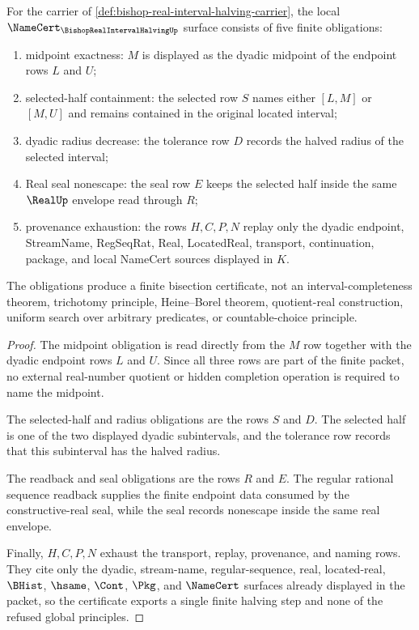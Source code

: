 \begin{theorem}
\label{thm:bishop-real-interval-halving-namecert-obligations}
For the carrier of \autoref{def:bishop-real-interval-halving-carrier}, the local $\NameCert_{\BishopRealIntervalHalvingUp}$ surface consists of five finite obligations:
\begin{enumerate}
\item midpoint exactness: $M$ is displayed as the dyadic midpoint of the endpoint rows $L$ and $U$;
\item selected-half containment: the selected row $S$ names either $[L,M]$ or $[M,U]$ and remains contained in the original located interval;
\item dyadic radius decrease: the tolerance row $D$ records the halved radius of the selected interval;
\item Real seal nonescape: the seal row $E$ keeps the selected half inside the same $\RealUp$ envelope read through $R$;
\item provenance exhaustion: the rows $H,C,P,N$ replay only the dyadic endpoint, StreamName, RegSeqRat, Real, LocatedReal, transport, continuation, package, and local NameCert sources displayed in $K$.
\end{enumerate}
The obligations produce a finite bisection certificate, not an interval-completeness theorem, trichotomy principle, Heine--Borel theorem, quotient-real construction, uniform search over arbitrary predicates, or countable-choice principle.
\end{theorem}
\begin{proof}
The midpoint obligation is read directly from the $M$ row together with the dyadic endpoint rows $L$ and $U$. Since all three rows are part of the finite packet, no external real-number quotient or hidden completion operation is required to name the midpoint.

The selected-half and radius obligations are the rows $S$ and $D$. The selected half is one of the two displayed dyadic subintervals, and the tolerance row records that this subinterval has the halved radius.

The readback and seal obligations are the rows $R$ and $E$. The regular rational sequence readback supplies the finite endpoint data consumed by the constructive-real seal, while the seal records nonescape inside the same real envelope.

Finally, $H,C,P,N$ exhaust the transport, replay, provenance, and naming rows. They cite only the dyadic, stream-name, regular-sequence, real, located-real, $\BHist$, $\hsame$, $\Cont$, $\Pkg$, and $\NameCert$ surfaces already displayed in the packet, so the certificate exports a single finite halving step and none of the refused global principles.
\end{proof}


